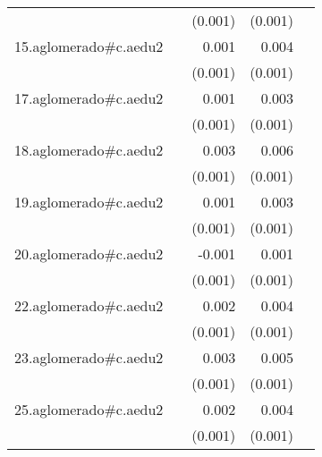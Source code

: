 {\begin{longtable}{l*{4}{D{.}{.}{-1}}}
            &                     &     (0.001)         &     (0.001)         &                     \\
\addlinespace
15.aglomerado#c.aedu2&                     &       0.001         &       0.004\sym{***}&                     \\
            &                     &     (0.001)         &     (0.001)         &                     \\
\addlinespace
17.aglomerado#c.aedu2&                     &       0.001         &       0.003\sym{***}&                     \\
            &                     &     (0.001)         &     (0.001)         &                     \\
\addlinespace
18.aglomerado#c.aedu2&                     &       0.003\sym{*}  &       0.006\sym{***}&                     \\
            &                     &     (0.001)         &     (0.001)         &                     \\
\addlinespace
19.aglomerado#c.aedu2&                     &       0.001         &       0.003\sym{***}&                     \\
            &                     &     (0.001)         &     (0.001)         &                     \\
\addlinespace
20.aglomerado#c.aedu2&                     &      -0.001         &       0.001         &                     \\
            &                     &     (0.001)         &     (0.001)         &                     \\
\addlinespace
22.aglomerado#c.aedu2&                     &       0.002         &       0.004\sym{***}&                     \\
            &                     &     (0.001)         &     (0.001)         &                     \\
\addlinespace
23.aglomerado#c.aedu2&                     &       0.003\sym{*}  &       0.005\sym{***}&                     \\
            &                     &     (0.001)         &     (0.001)         &                     \\
\addlinespace
25.aglomerado#c.aedu2&                     &       0.002         &       0.004\sym{***}&                     \\
            &                     &     (0.001)         &     (0.001)         &                     \\

\end{longtable}}
